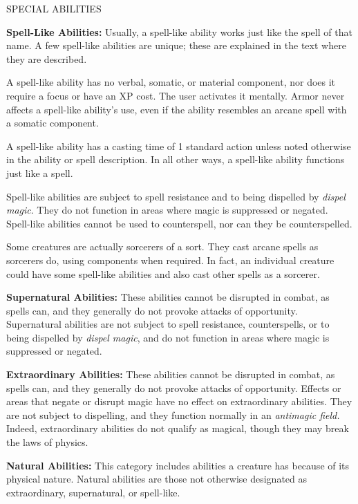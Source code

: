 \documentclass{article}
\begin{document}
\vspace{12pt}
{\LARGE{}SPECIAL ABILITIES}

\textbf{Spell-Like Abilities:} Usually, a spell-like ability works just like the 
spell of that name. A few spell-like abilities are unique; these are explained 
in the text where they are described.

A spell-like ability has no verbal, somatic, or material component, nor does it 
require a focus or have an XP cost. The user activates it mentally. Armor never 
affects a spell-like ability's use, even if the ability resembles an arcane spell 
with a somatic component.

A spell-like ability has a casting time of 1 standard action unless noted otherwise 
in the ability or spell description. In all other ways, a spell-like ability functions 
just like a spell.

Spell-like abilities are subject to spell resistance and to being dispelled by 
\textit{dispel magic}. They do not function in areas where magic is suppressed 
or negated. Spell-like abilities cannot be used to counterspell, nor can they be 
counterspelled.

Some creatures are actually sorcerers of a sort. They cast arcane spells as sorcerers 
do, using components when required. In fact, an individual creature could have 
some spell-like abilities and also cast other spells as a sorcerer.

\textbf{Supernatural Abilities:} These abilities cannot be disrupted in combat, 
as spells can, and they generally do not provoke attacks of opportunity. Supernatural 
abilities are not subject to spell resistance, counterspells, or to being dispelled 
by \textit{dispel magic}, and do not function in areas where magic is suppressed 
or negated.

\textbf{Extraordinary Abilities:} These abilities cannot be disrupted in combat, 
as spells can, and they generally do not provoke attacks of opportunity. Effects 
or areas that negate or disrupt magic have no effect on extraordinary abilities. 
They are not subject to dispelling, and they function normally in an \textit{antimagic 
field. }Indeed, extraordinary abilities do not qualify as magical, though they 
may break the laws of physics.

\textbf{Natural Abilities:} This category includes abilities a creature has because 
of its physical nature. Natural abilities are those not otherwise designated as 
extraordinary, supernatural, or spell-like.

\newpage
\end{document}
